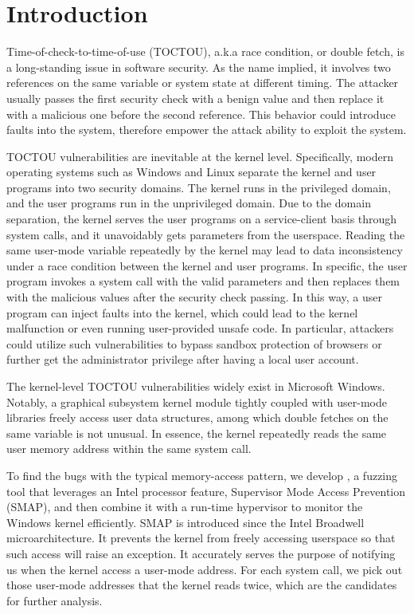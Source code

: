 
\section{Introduction}
\label{sec:ktoctou-introduction}

Time-of-check-to-time-of-use (TOCTOU), a.k.a race condition, or double fetch, is a long-standing issue in software security. As the name implied, it involves two references on the same variable or system state at different timing. The attacker usually passes the first security check with a benign value and then replace it with a malicious one before the second reference. This behavior could introduce faults into the system, therefore empower the attack ability to exploit the system.

TOCTOU vulnerabilities are inevitable at the kernel level. Specifically, modern operating systems such as Windows and Linux separate the kernel and user programs into two security domains. The kernel runs in the privileged domain, and the user programs run in the unprivileged domain. Due to the domain separation, the kernel serves the user programs on a service-client basis through system calls, and it unavoidably gets parameters from the userspace. Reading the same user-mode variable repeatedly by the kernel may lead to data inconsistency under a race condition between the kernel and user programs. In specific, the user program invokes a system call with the valid parameters and then replaces them with the malicious values after the security check passing. In this way, a user program can inject faults into the kernel, which could lead to the kernel malfunction or even running user-provided unsafe code. In particular, attackers could utilize such vulnerabilities to bypass sandbox protection of browsers or further get the administrator privilege after having a local user account.

The kernel-level TOCTOU vulnerabilities widely exist in Microsoft Windows. Notably, a graphical subsystem kernel module tightly coupled with user-mode libraries freely access user data structures, among which double fetches on the same variable is not unusual. In essence, the kernel repeatedly reads the same user memory address within the same system call.

To find the bugs with the typical memory-access pattern, we develop \toolname, a fuzzing tool that leverages an Intel processor feature, Supervisor Mode Access Prevention (SMAP), and then combine it with a run-time hypervisor to monitor the Windows kernel efficiently. SMAP is introduced since the Intel Broadwell microarchitecture. It prevents the kernel from freely accessing userspace so that such access will raise an exception. It accurately serves the purpose of notifying us when the kernel access a user-mode address. For each system call, we pick out those user-mode addresses that the kernel reads twice, which are the candidates for further analysis. 

